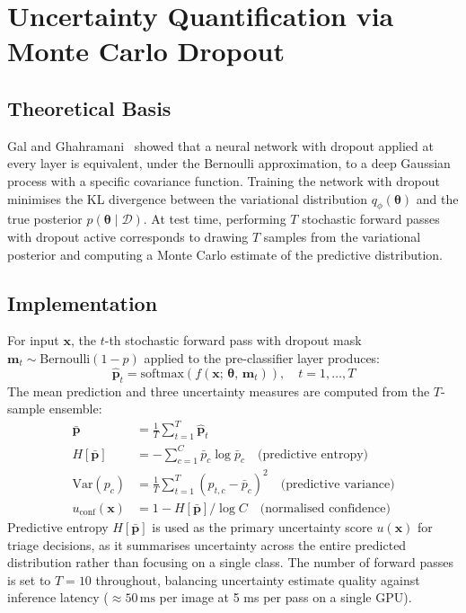 \section{Uncertainty Quantification via Monte Carlo Dropout}

\subsection{Theoretical Basis}

Gal and Ghahramani~\cite{gal2016dropout} showed that a neural network with dropout applied at every layer is equivalent, under the Bernoulli approximation, to a deep Gaussian process with a specific covariance function. Training the network with dropout minimises the KL divergence between the variational distribution $q_\phi(\boldsymbol{\theta})$ and the true posterior $p(\boldsymbol{\theta} \mid \mathcal{D})$. At test time, performing $T$ stochastic forward passes with dropout active corresponds to drawing $T$ samples from the variational posterior and computing a Monte Carlo estimate of the predictive distribution.

\subsection{Implementation}

For input $\mathbf{x}$, the $t$-th stochastic forward pass with dropout mask $\mathbf{m}_t \sim \text{Bernoulli}(1-p)$ applied to the pre-classifier layer produces:
\begin{equation}
    \hat{\mathbf{p}}_t = \text{softmax}\!\left(f(\mathbf{x};\, \boldsymbol{\theta},\, \mathbf{m}_t)\right), \quad t = 1, \ldots, T
\end{equation}
The mean prediction and three uncertainty measures are computed from the $T$-sample ensemble:
\begin{align}
    \bar{\mathbf{p}} &= \frac{1}{T} \sum_{t=1}^{T} \hat{\mathbf{p}}_t \label{eq:mean_pred} \\
    H[\bar{\mathbf{p}}] &= -\sum_{c=1}^{C} \bar{p}_c \log \bar{p}_c \quad \text{(predictive entropy)} \label{eq:entropy} \\
    \text{Var}(p_c) &= \frac{1}{T} \sum_{t=1}^{T} (p_{t,c} - \bar{p}_c)^2 \quad \text{(predictive variance)} \label{eq:var} \\
    u_{\text{conf}}(\mathbf{x}) &= 1 - H[\bar{\mathbf{p}}] / \log C \quad \text{(normalised confidence)} \label{eq:conf}
\end{align}
Predictive entropy $H[\bar{\mathbf{p}}]$ is used as the primary uncertainty score $u(\mathbf{x})$ for triage decisions, as it summarises uncertainty across the entire predicted distribution rather than focusing on a single class. The number of forward passes is set to $T = 10$ throughout, balancing uncertainty estimate quality against inference latency ($\approx 50\,\text{ms}$ per image at 5 ms per pass on a single GPU).

